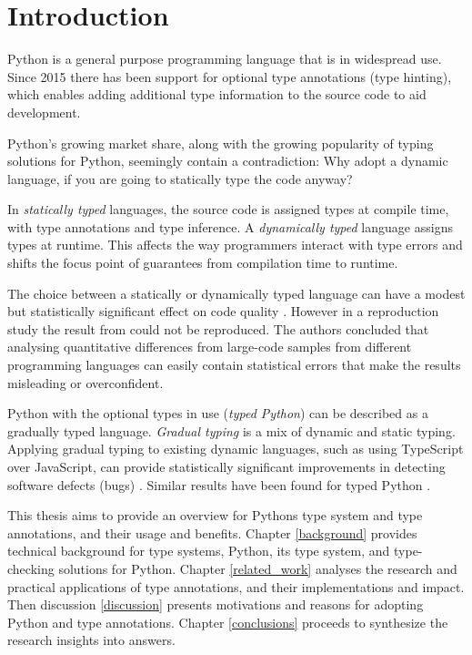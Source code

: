 \chapter{Introduction\label{intro}}

Python is a general purpose programming language that is in widespread use. Since 2015 there has been support for optional type annotations (type hinting), which enables adding additional type information to the source code to aid development.

Python's growing market share, along with the growing popularity of typing solutions for Python, seemingly contain a contradiction: Why adopt a dynamic language, if you are going to statically type the code anyway?

In \emph{statically typed} languages, the source code is assigned types at compile time, with type annotations and type inference. A \emph{dynamically typed} language assigns types at runtime. This affects the way programmers interact with type errors and shifts the focus point of guarantees from compilation time to runtime.

The choice between a statically or dynamically typed language can have a modest but statistically significant effect on code quality \cite{nanz_comparative_2015, ray_codequality_2014}. However in a reproduction study \cite{codequality_reproudction_2019} the result from \cite{ray_codequality_2014} could not be reproduced. The authors concluded that analysing quantitative differences from large-code samples from different programming languages can easily contain statistical errors that make the results misleading or overconfident.

Python with the optional types in use (\emph{typed Python}) can be described as a gradually typed language. \emph{Gradual typing} is a mix of dynamic and static typing. Applying gradual typing to existing dynamic languages, such as using TypeScript over JavaScript, can provide statistically significant improvements in detecting software defects (bugs) \cite{gao_to_type_or_not_2017}. Similar results have been found for typed Python \cite{khan_empirical_2022, rak-amnouykit_taleoftwo_2020}.

This thesis aims to provide an overview for Pythons type system and type annotations, and their usage and benefits. Chapter \ref{background} provides technical background for type systems, Python, its type system, and type-checking solutions for Python. Chapter \ref{related_work} analyses the research and practical applications of type annotations, and their implementations and impact. Then discussion \ref{discussion} presents motivations and reasons for adopting Python and type annotations. Chapter \ref{conclusions} proceeds to synthesize the research insights into answers.